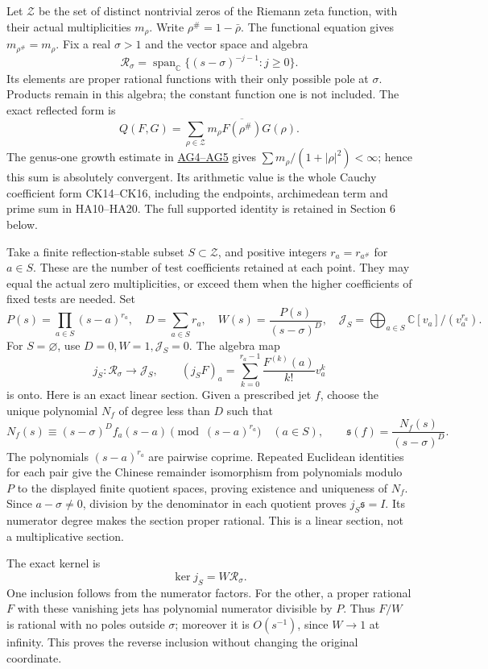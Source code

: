 \documentclass[
  10pt,
  a4paper,
]{article}
\begin{document}
Let \(\mathcal Z\) be the set of distinct nontrivial zeros of the
Riemann zeta function, with their actual multiplicities \(m_\rho\).
Write \(\rho^\#=1-\bar\rho\). The functional equation gives
\(m_{\rho^\#}=m_\rho\). Fix a real \(\sigma>1\) and the vector space and
algebra \[
\mathcal R_\sigma=\operatorname{span}_{\mathbb C}\{(s-\sigma)^{-j-1}:j\ge0\}.
\tag{FJ1}
\] Its elements are proper rational functions with their only possible
pole at \(\sigma\). Products remain in this algebra; the constant
function one is not included. The exact reflected form is \[
Q(F,G)=\sum_{\rho\in\mathcal Z}m_\rho
 \overline{F(\rho^\#)}G(\rho).
\tag{FJ2}
\] The genus-one growth estimate in
\href{ACTUAL_HEAT_ZERO_DISTRIBUTION_VARIATION.md}{AG4--AG5} gives
\(\sum m_\rho/(1+|\rho|^2)<\infty\); hence this sum is absolutely
convergent. Its arithmetic value is the whole Cauchy coefficient form
CK14--CK16, including the endpoints, archimedean term and prime sum in
HA10--HA20. The full supported identity is retained in Section 6 below.

Take a finite reflection-stable subset \(S\subset\mathcal Z\), and
positive integers \(r_a=r_{a^\#}\) for \(a\in S\). These are the number
of test coefficients retained at each point. They may equal the actual
zero multiplicities, or exceed them when the higher coefficients of
fixed tests are needed. Set \[
P(s)=\prod_{a\in S}(s-a)^{r_a},\quad D=\sum_{a\in S}r_a,
\quad W(s)=\frac{P(s)}{(s-\sigma)^D},\quad
\mathcal J_S=\bigoplus_{a\in S}\mathbb C[v_a]/(v_a^{r_a}).
\tag{FJ3}
\] For \(S=\varnothing\), use \(D=0,W=1,\mathcal J_S=0\). The algebra
map \[
j_S:\mathcal R_\sigma\longrightarrow\mathcal J_S,
\qquad (j_SF)_a=\sum_{k=0}^{r_a-1}\frac{F^{(k)}(a)}{k!}v_a^k
\tag{FJ4}
\] is onto. Here is an exact linear section. Given a prescribed jet
\(f\), choose the unique polynomial \(N_f\) of degree less than \(D\)
such that \[
N_f(s)\equiv (s-\sigma)^D f_a(s-a)
 \pmod{(s-a)^{r_a}}\quad(a\in S),\qquad
\mathfrak s(f)=\frac{N_f(s)}{(s-\sigma)^D}.
\tag{FJ5}
\] The polynomials \((s-a)^{r_a}\) are pairwise coprime. Repeated
Euclidean identities for each pair give the Chinese remainder
isomorphism from polynomials modulo \(P\) to the displayed finite
quotient spaces, proving existence and uniqueness of \(N_f\). Since
\(a-\sigma\ne0\), division by the denominator in each quotient proves
\(j_S\mathfrak s=I\). Its numerator degree makes the section proper
rational. This is a linear section, not a multiplicative section.

The exact kernel is \[
\ker j_S=W\mathcal R_\sigma.
\tag{FJ6}
\] One inclusion follows from the numerator factors. For the other, a
proper rational \(F\) with these vanishing jets has polynomial numerator
divisible by \(P\). Thus \(F/W\) is rational with no poles outside
\(\sigma\); moreover it is \(O(s^{-1})\), since \(W\to1\) at infinity.
This proves the reverse inclusion without changing the original
coordinate.
\end{document}

